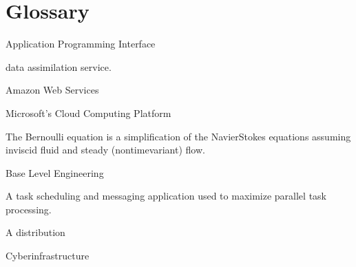 \documentclass[letterpaper,12pt,english,openany,oneside]{sphinxmanual}
\begin{document}
\appendix
{}\label{\detokenize{glossary::doc}}

\chapter{Glossary}
\label{\detokenize{glossary:glossary}}\begin{description}
\sphinxAtStartPar
Application Programming Interface

\sphinxAtStartPar
{\hyperref[\detokenize{glossary:term-RGVFlood.com}]{}} data assimilation service.

\sphinxAtStartPar
Amazon Web Services

\sphinxAtStartPar
Microsoft’s Cloud Computing Platform

\sphinxAtStartPar
The Bernoulli equation is a simplification of the Navier\sphinxhyphen{}Stokes equations assuming inviscid fluid and steady (non\sphinxhyphen{}time\sphinxhyphen{}variant) flow.

\sphinxAtStartPar
Base Level Engineering

\sphinxAtStartPar
A task scheduling and messaging application used to maximize parallel task processing.

\sphinxAtStartPar
A {\hyperref[\detokenize{glossary:term-Linux}]{}} distribution

\sphinxAtStartPar
Cyberinfrastructure


\end{description}
\end{document}
